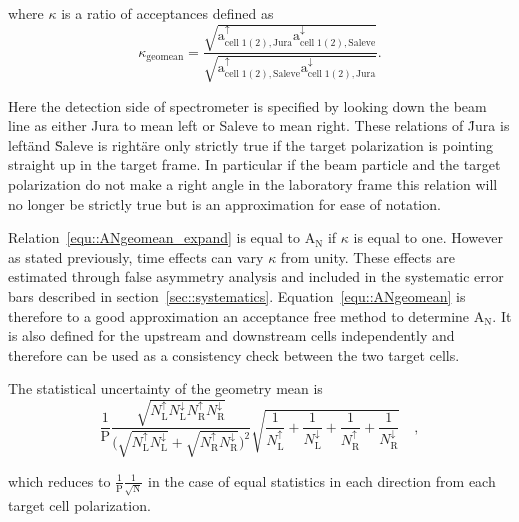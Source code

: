 \noindent
where $\kappa$ is a ratio of acceptances defined as
\begin{equation}
  \kappa_{\mathrm{geomean}} =
  \frac{\sqrt{\mathrm{a}^{\uparrow}_{\mathrm{cell\;1(2),Jura}}
      \mathrm{a}^{\downarrow}_{\mathrm{cell\;1(2),Saleve}}}}
       {\sqrt{\mathrm{a}^{\uparrow}_{\mathrm{cell\;1(2),Saleve}}
           \mathrm{a}^{\downarrow}_{\mathrm{cell\;1(2),Jura}}}}.
       \label{equ::accGeoMean}
\end{equation}

\noindent
Here the detection side of spectrometer is specified by looking down the beam
line as either Jura to mean left or Saleve to mean right.  These relations of
\"Jura is left\" and \"Saleve is right\" are only strictly true if the target
polarization is pointing straight up in the target frame.  In particular if the
beam particle and the target polarization do not make a right angle in the
laboratory frame this relation will no longer be strictly true but is an
approximation for ease of notation.

Relation~\ref{equ::ANgeomean_expand} is equal to A$_{\mathrm{N}}$ if $\kappa$ is
equal to one.  However as stated previously, time effects can vary $\kappa$ from
unity. These effects are estimated through false asymmetry analysis and included
in the systematic error bars described in section~\ref{sec::systematics}.
Equation~\ref{equ::ANgeomean} is therefore to a good approximation an acceptance
free method to determine A$_{\mathrm{N}}$.  It is also defined for the upstream
and downstream cells independently and therefore can be used as a consistency
check between the two target cells.

The statistical uncertainty of the geometry mean is
\begin{equation}
  \frac{1}{\mathrm{P}}
  \frac{
    \sqrt{
      N_{\mathrm{L}}^{\uparrow}N_{\mathrm{L}}^{\downarrow}
      N_{\mathrm{ R}}^{\uparrow}N_{\mathrm{R}}^{\downarrow}
    }
  }{
    \Big( \sqrt{N_{\mathrm{L}}^{\uparrow}N_{\mathrm{L}}^{\downarrow}} +
    \sqrt{N_{\mathrm{R}}^{\uparrow}N_{\mathrm{R}}^{\downarrow}} \Big)^2
  }
  \sqrt{
    \frac{1}{N_{\mathrm{L}}^{\uparrow}} +
    \frac{1}{N_{\mathrm{L}}^{\downarrow}} +
    \frac{1}{N_{\mathrm{R}}^{\uparrow}} +
    \frac{1}{N_{\mathrm{R}}^{\downarrow}}
  } \quad,
\end{equation}

\noindent
which reduces to $\frac{1}{\mathrm{P}}\frac{1}{\sqrt{\mathrm{N}}}$ in the case
of equal statistics in each direction from each target cell polarization.


